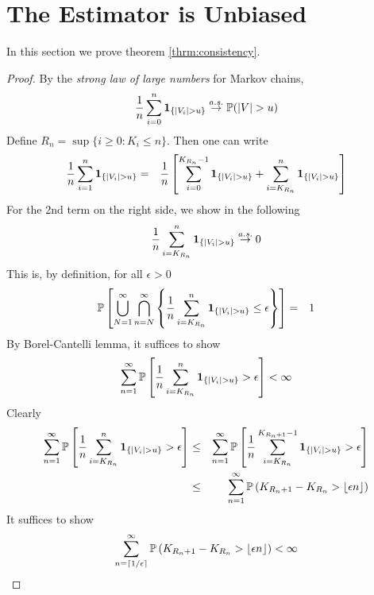 \documentclass[aoas,preprint]{imsart}
\numberwithin{equation}{section}
\theoremstyle{plain}
\begin{document}
\section{The Estimator is Unbiased}\label{sec:consistency}
In this section we prove theorem \ref{thrm:consistency}.
\begin{proof}
  By the {\em strong law of large numbers} for Markov chains,
  \begin{eqnarray*}
    {1 \over n} \sum_{i=0}^n \mathbf{1}_{\{|V_i| > u\}} \overset{a.s.}{\to} \mathbb{P}(|V| > u)
  \end{eqnarray*}
  Define $R_n =\sup\{i \geq 0: K_i \leq n\}$. Then one can write
  \begin{eqnarray}
    {1 \over n} \sum_{i=1}^n \mathbf{1}_{\{|V_i| > u\}}
    &=& 
    {1 \over n} \left[
      \sum_{i=0}^{K_{R_n}-1} \mathbf{1}_{\{|V_i| > u\}} + \sum_{i=K_{R_n}}^n \mathbf{1}_{\{|V_i| > u\}}
    \right]
    \label{eq:kioj}
  \end{eqnarray}
  For the 2nd term on the right side, we show in the following
  \begin{equation}
    \label{eq:frf}
    {1 \over n}\sum_{i=K_{R_n}}^n \mathbf{1}_{\{|V_i| > u\}} \overset{a.s.}{\to} 0
  \end{equation}
  This is, by definition, for all $\epsilon > 0$
  \begin{eqnarray*}
    \mathbb{P} \left[
      \bigcup_{N=1}^\infty \bigcap_{n=N}^\infty
      \left\{
        {1 \over n} \sum_{i=K_{R_n}}^{n} \mathbf{1}_{\{|V_i| > u\}} \leq \epsilon
      \right\}
    \right] &=& 1
  \end{eqnarray*}
  By Borel-Cantelli lemma, it suffices to show
  \[
  \sum_{n=1}^\infty \mathbb{P}\left[
    {1 \over n} \sum_{i=K_{R_n}}^{n} \mathbf{1}_{\{|V_i| > u\}} > \epsilon
  \right] < \infty
  \]
  Clearly
  \begin{eqnarray*}
    \sum_{n=1}^\infty \mathbb{P}\left[
      {1 \over n} \sum_{i=K_{R_n}}^{n} \mathbf{1}_{\{|V_i| > u\}} > \epsilon
    \right]
    &\leq&
    \sum_{n=1}^\infty \mathbb{P}\left[
      {1 \over n} \sum_{i=K_{R_n}}^{K_{R_n + 1} - 1} \mathbf{1}_{\{|V_i| > u\}} > \epsilon
    \right] \\
    &\leq&
    \sum_{n=1}^\infty \mathbb{P}\left(
      {K_{R_n + 1} - K_{R_n}} > \lfloor \epsilon n\rfloor
    \right)
  \end{eqnarray*}
  It suffices to show
  \[
  \sum_{n=\lceil 1/\epsilon\rceil}^\infty \mathbb{P}\left(
    {K_{R_n + 1} - K_{R_n}} > \lfloor \epsilon n\rfloor
  \right) < \infty
\]
\end{proof}
\end{document}
